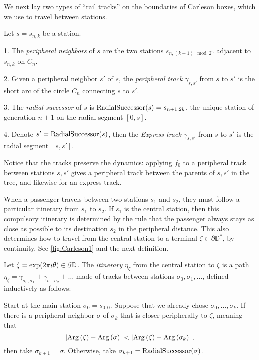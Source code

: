 We next lay two types of \enquote{rail tracks} on the boundaries of Carleson boxes, which we use to travel between stations.

\begin{definition}
Let $s=s_{n,k}$ be a station.

1. The \emph{peripheral neighbors} of $s$ are the two stations $s_{n,\left(k\pm1\right)\mod2^{n}}$ adjacent to $s_{n,k}$ on $C_{n}$.

2. Given a peripheral neighbor $s'$ of $s$, the \emph{peripheral
	track }$\gamma_{s,s'}$ from $s$ to $s'$
is the short arc of the circle $C_{n}$ connecting $s$ to $s'$.

3. The \emph{radial successor} of $s$ is $\operatorname{RadialSuccessor}(s)=s_{n+1,2k}$, the unique station of generation $n+1$ on the radial segment $[0,s]$.

4. Denote $s'=\operatorname{RadialSuccessor}(s)$, then the \emph{Express track} $\gamma_{s,s'}$ from $s$ to $s'$ is the radial segment $[s,s']$.

\end{definition}

Notice that the tracks preserve the dynamics: applying $f_0$ to a peripheral track between stations $s,s'$ gives a peripheral track between the parents of $s,s'$ in the tree, and likewise for an express track.

When a passenger travels between two stations $s_1$ and $s_2$, they must follow a particular itinerary from $s_1$ to $s_2$.
If $s_1$ is the central station, then this compulsory itinerary is determined by the rule that the passenger always stays as close as possible to its destination $s_2$ in the peripheral distance. 
This also determines how to travel from the central station to a terminal $\zeta\in \partial \mathbb D^*$, by continuity. See \cref{fig:Carleson1} and the next definition.


\begin{definition}
Let $\zeta=\exp(2\pi i\theta)\in\partial\mathbb{D}$. The \emph{itinerary} $\eta_\zeta$ from the central station to $\zeta$ is a path 
$\eta_\zeta = \gamma _{\sigma_0,\sigma_1} + \gamma_{\sigma_1,\sigma_2}+\ldots$ made of tracks between stations $\sigma_0,\sigma_1,\ldots$, defined inductively as follows:

Start at the main station $\sigma_0=s_{0,0}$. Suppose that we already chose $\sigma_0,\ldots,\sigma_k$. If there is a peripheral neighbor $\sigma$ of $\sigma_k$ that is closer peripherally to $\zeta$, meaning that $$\left|\operatorname{Arg}\left(\zeta\right)-\operatorname{Arg}\left(\sigma\right)\right|
< \left|\operatorname{Arg}\left(\zeta\right)-\operatorname{Arg}\left(\sigma_{k}\right)\right|,$$ then take $\sigma_{k+1}=\sigma$. Otherwise, take 
$\sigma_{k+1}=\operatorname{RadialSuccessor}(\sigma)$.
\end{definition}

